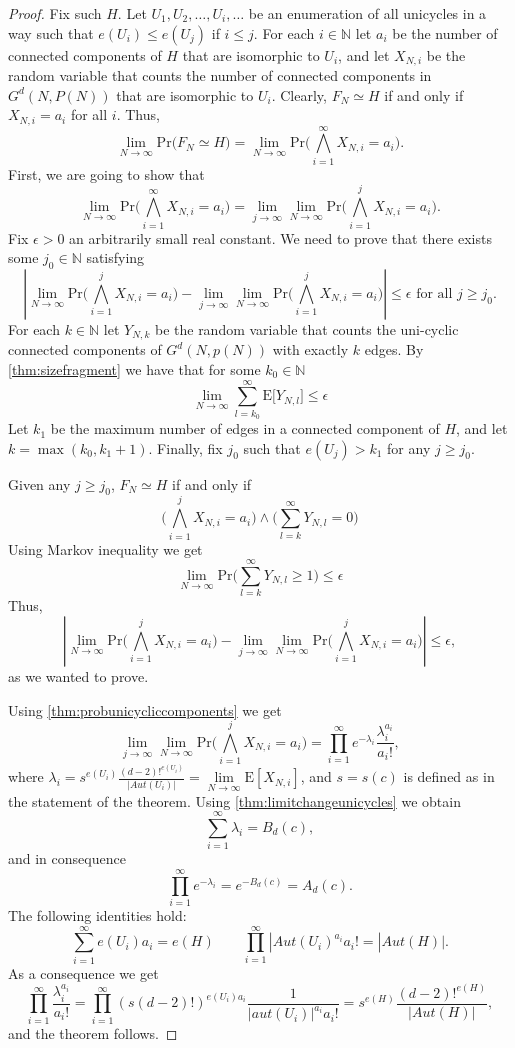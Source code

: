 \documentclass[11pt,notitlepage,a4paper]{article}
\theoremstyle{definition}
\newcommand{\N}{\mathbb{N}}
\newcommand{\LN}{\lim\limits_{N\to \infty}}
\begin{document}
\begin{proof}
	Fix such $H$.
	Let $U_1,U_2,\dots, U_i,\dots$ be an enumeration of all unicycles in a way
	such that $e(U_i)\leq e(U_j)$ if $i\leq j$.  For each $i\in \N$ let $a_i$
	be the number of connected components of $H$ that are isomorphic to $U_i$,
	and let $X_{N,i}$ be the random variable that counts the number of connected 
	components in $G^d(N,P(N))$ that are isomorphic to $U_i$. Clearly,
	$F_N\simeq H$ if and only if $X_{N,i}=a_i$ for all $i$.  Thus,
	\[
	\LN \mathrm{Pr}\big(F_N\simeq H\big)= 
	\LN \mathrm{Pr}\big( \bigwedge_{i=1}^\infty X_{N,i}=a_i\big).
	\]
	First, we are going to show that 
	\[
	\LN \mathrm{Pr}\big( \bigwedge_{i=1}^\infty X_{N,i}=a_i\big)=
	\lim\limits_{j\to \infty}
	\LN \mathrm{Pr}\big( \bigwedge_{i=1}^j X_{N,i}=a_i\big).
	\]
	Fix $\epsilon > 0$ an arbitrarily small real constant. We need
	to prove that there exists some $j_0\in \N$ satisfying
	\[
	\left|\LN \mathrm{Pr}\big( \bigwedge_{i=1}^j X_{N,i}=a_i\big)
	- \lim\limits_{j\to \infty}
	\LN \mathrm{Pr}\big( \bigwedge_{i=1}^j X_{N,i}=a_i\big)
	\right|
	\leq \epsilon
	\text{ for all } j\geq j_0.
	\]
	For each $k \in \N$ let $Y_{N,k}$ be the random variable
	that counts the uni-cyclic connected components of $G^d(N,p(N))$
	with exactly $k$ edges.	By \cref{thm:sizefragment}
	we have that for some $k_0\in \N$
	\[ 
	\LN \sum_{l=k_0}^{\infty }\mathrm{E}\big[ Y_{N,l} \big] \leq 
	\epsilon
	\]
	Let $k_1$ be the maximum number of edges in a connected component of 
	$H$, and let $k = \max(k_0, k_1+1)$. Finally, fix $j_0$ such that 
	$e(U_j)>k_1$ for any $j\geq j_0$. \par
	Given any $j\geq j_0$, $F_N \simeq H$ if and only if 
	\[
	\big(\bigwedge_{i=1}^{j} X_{N,i}=a_i\big) \wedge
	\big(\sum_{l=k}^\infty Y_{N,l}=0  \big) 
	\]
	Using Markov inequality we get 
	\[
	\LN \mathrm{Pr}\big( \sum_{l=k}^\infty Y_{N,l}\geq 1  \big) \leq \epsilon
	\]
	Thus,
	\[
	\left|\LN \mathrm{Pr}\big( \bigwedge_{i=1}^j X_{N,i}=a_i\big)
	- \lim\limits_{j\to \infty}
	\LN \mathrm{Pr}\big( \bigwedge_{i=1}^j X_{N,i}=a_i\big)
	\right|
	\leq \epsilon,
	\]
	as we wanted to prove. 	\par
	Using \cref{thm:probunicycliccomponents} we get
	\[
	\lim\limits_{j\to \infty}
	\LN \mathrm{Pr}\big( \bigwedge_{i=1}^j X_{N,i}=a_i\big)=
	\prod_{i=1}^\infty e^{-\lambda_i} \frac{\lambda_i^{a_i}}{a_i!},
	\]
	where $\lambda_i=s^{e(U_i)}\frac{(d-2)!^{e(U_i)}}{|Aut(U_i)|}= 
	\LN \mathrm{E}[X_{N,i}]$, and $s=s(c)$ is defined as in the statement 
	of the theorem. Using \cref{thm:limitchangeunicycles} we obtain
	\[
	\sum_{i=1}^{\infty} \lambda_i = B_d(c),
	\]
	and in consequence 
	\[
	\prod_{i=1}^\infty e^{-\lambda_i}= e^{-B_d(c)}=A_d(c).
	\]
	The following identities hold:
	\[
	\sum_{i=1}^\infty e(U_i)a_i = e(H) \qquad 
	\prod_{i=1}^{\infty} |Aut(U_i)^{a_i} a_i!= |Aut(H)|.
	\]
	As a consequence we get
	\[
	\prod_{i=1}^\infty \frac{\lambda_i^{a_i}}{a_i!}=
	\prod_{i=1}^\infty (s(d-2)!)^{e(U_i)a_i} 
	\frac{1}{|aut(U_i)|^{a_i}a_i!}=
	s^{e(H)}\frac{(d-2)!^{e(H)}}{|Aut(H)|},
	\]
	and the theorem follows. 
\end{proof}
\end{document}
